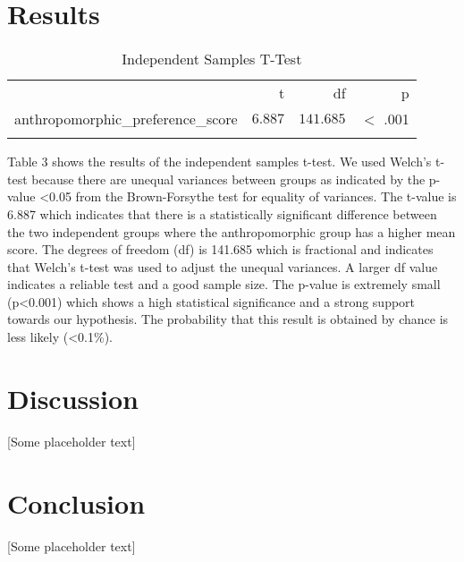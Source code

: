 \documentclass[conference]{IEEEtran}
\begin{document}
\section{Results}
\begin{table}[h]
	\centering
	\caption{Independent Samples T-Test}
	\label{tab:independentSamplesT-Test}
	{
		\begin{tabular}{lrrr}
			\toprule
			$ $ & t & df & p  \\
			\cmidrule[0.4pt]{1-4}
			anthropomorphic\_preference\_score & $6.887$ & $141.685$ & $<$ .001  \\
			\bottomrule
			\addlinespace[1ex]
			\multicolumn{4}{p{0.5\linewidth}}{\textit{Note.} Welch's t-test.} \\
		\end{tabular}
	}
\end{table}

Table 3 shows the results of the independent samples t-test. We used Welch’s t-test because there are unequal variances between groups as indicated by the p-value \textless 0.05 from the Brown-Forsythe test for equality of variances. The t-value is 6.887 which indicates that there is a statistically significant difference between the two independent groups where the anthropomorphic group has a higher mean score. The degrees of freedom (df) is 141.685 which is fractional and indicates that Welch’s t-test was used to adjust the unequal variances. A larger df value indicates a reliable test and a good sample size. The p-value is extremely small (p\textless0.001) which shows a high statistical significance and a strong support towards our hypothesis. The probability that this result is obtained by chance is less likely (\textless 0.1\%).                 

\section{Discussion}
 [Some placeholder text]

\section{Conclusion}
 [Some placeholder text]
\end{document}
